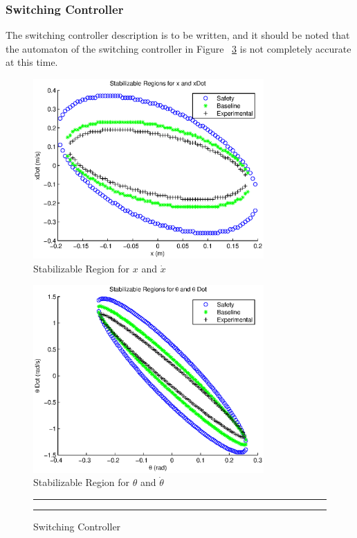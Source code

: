 \documentclass[conference]{IEEEtran}
\begin{document}
\subsubsection{Switching Controller}
The switching controller description is to be written, and it should be noted that the automaton of the switching controller in Figure ~\ref{fig:switchingController} is not completely accurate at this time.

\begin{figure}[htp]
\centering
\includegraphics[width=250pt]{stabRegionX}
\caption{Stabilizable Region for $x$ and $\dot{x}$}\label{fig:stabRegionX}
\end{figure}

\begin{figure}[htp]
\centering
\includegraphics[width=250pt]{stabRegionTheta}
\caption{Stabilizable Region for $\theta$ and $\dot{\theta}$}\label{fig:stabRegionTheta}
\end{figure}

\begin{figure}[h!]
\centering
  \hrule
	{}
  \hrule
  \caption{Switching Controller}
  \label{fig:switchingController}
\end{figure}
\end{document}
